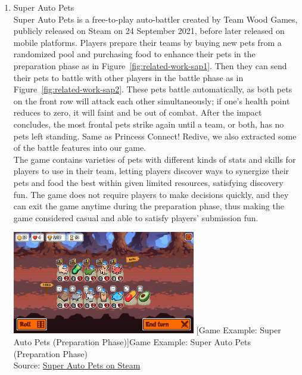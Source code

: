 \documentclass[12pt,oneside,openright,a4paper]{cpe-english-project}
\begin{document}
\begin{enumerate}
\begin{minipage}[c]{\textwidth}
	[Game Example : Omega (Simulation Section)]{Game Example : Omega (Simulation Section) \cite{mobygamesomega}}
	\label{fig:related-work-omega-sim}
	\end{minipage}

	\item Super Auto Pets \\
	Super Auto Pets is a free-to-play auto-battler created by Team Wood Games, publicly released on Steam on 24 September 2021, before later released on mobile platforms. Players prepare their teams by buying new pets from a randomized pool and purchasing food to enhance their pets in the preparation phase as in Figure~\ref{fig:related-work-sap1}. Then they can send their pets to battle with other players in the battle phase as in Figure~\ref{fig:related-work-sap2}. These pets battle automatically, as both pets on the front row will attack each other simultaneously; if one's health point reduces to zero, it will faint and be out of combat. After the impact concludes, the most frontal pets strike again until a team, or both, has no pets left standing. Same as Princess Connect! Redive, we also extracted some of the battle features into our game. \\
	The game contains varieties of pets with different kinds of stats and skills for players to use in their team, letting players discover ways to synergize their pets and food the best within given limited resources, satisfying discovery fun. The game does not require players to make decisions quickly, and they can exit the game anytime during the preparation phase, thus making the game considered casual and able to satisfy players' submission fun. \\
	\begin{minipage}[c]{\textwidth}\centering
	\includegraphics[width=8cm]{figure/related-work-sap1.png}
	[Game Example: Super Auto Pets (Preparation Phase)]{Game Example: Super Auto Pets (Preparation Phase) 
		\\ Source: \href{https://store.steampowered.com/app/1714040/Super_Auto_Pets/}{Super Auto Pets on Steam}}

\end{minipage}
\end{enumerate}
\end{document}
